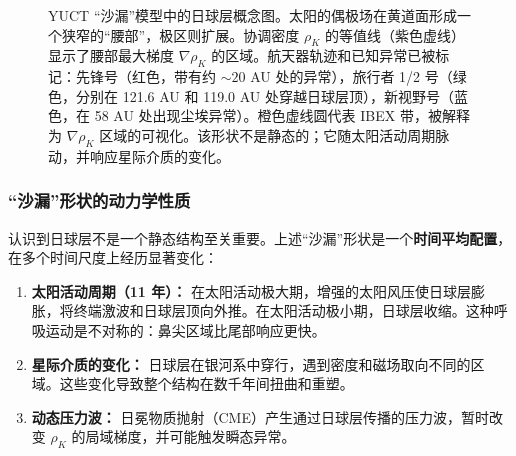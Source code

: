 \documentclass[11pt,a4paper]{article}
\theoremstyle{remark}
\begin{document}
\begin{figure}[htbp]
		\caption{YUCT “沙漏”模型中的日球层概念图。太阳的偶极场在黄道面形成一个狭窄的“腰部”，极区则扩展。协调密度 $\rho_K$ 的等值线（紫色虚线）显示了腰部最大梯度 $\nabla\rho_K$ 的区域。航天器轨迹和已知异常已被标记：先锋号（红色，带有约 $\sim20$ AU 处的异常），旅行者 1/2 号（绿色，分别在 121.6 AU 和 119.0 AU 处穿越日球层顶），新视野号（蓝色，在 58 AU 处出现尘埃异常）。橙色虚线圆代表 IBEX 带，被解释为 $\nabla\rho_K$ 区域的可视化。该形状不是静态的；它随太阳活动周期脉动，并响应星际介质的变化。}
		\label{fig:coord:heliosphere_hourglass}
	\end{figure}
	
	\subsubsection{“沙漏”形状的动力学性质}
	\label{subsubsec:coord:dynamic}
	
	认识到日球层不是一个静态结构至关重要。上述“沙漏”形状是一个\textbf{时间平均配置}，在多个时间尺度上经历显著变化：
	
	\begin{enumerate}
		\item \textbf{太阳活动周期（11 年）：} 在太阳活动极大期，增强的太阳风压使日球层膨胀，将终端激波和日球层顶向外推。在太阳活动极小期，日球层收缩。这种呼吸运动是不对称的：鼻尖区域比尾部响应更快。
		
		\item \textbf{星际介质的变化：} 日球层在银河系中穿行，遇到密度和磁场取向不同的区域。这些变化导致整个结构在数千年间扭曲和重塑。
		
		\item \textbf{动态压力波：} 日冕物质抛射（CME）产生通过日球层传播的压力波，暂时改变 $\rho_K$ 的局域梯度，并可能触发瞬态异常。
	\end{enumerate}
	
\end{document}
